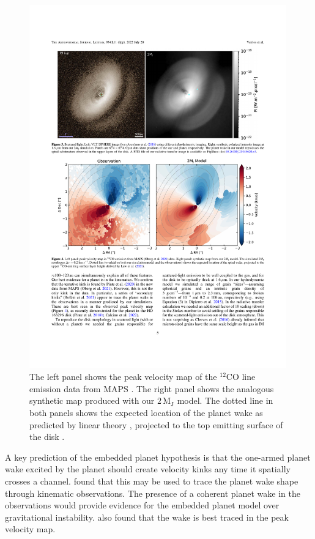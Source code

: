 \begin{figure}
    \centering
    \includegraphics[width = 0.99\textwidth]{figures/verrios_v0.pdf}
    \caption{The left panel shows the peak velocity map of the $^{12}$CO line emission data from MAPS \citep{oberg2021}. The right panel shows the analogous synthetic map produced with our $2 \, \mathrm{M_J}$ model. The dotted line in both panels shows the expected location of the planet wake as predicted by linear theory \citep{ogilvie2002}, projected to the top emitting surface of the disk \citep{pinte2018,law2021}.}
    \label{fig:verrios_v0}
\end{figure}

A key prediction of the embedded planet hypothesis is that the one-armed planet wake excited by the planet should create velocity kinks any time it spatially crosses a channel.
\citet{calcino2022} found that this may be used to trace the planet wake shape through kinematic observations.
The presence of a coherent planet wake in the observations would provide evidence for the embedded planet model over gravitational instability.
\citet{calcino2022} also found that the wake is best traced in the peak velocity map.

